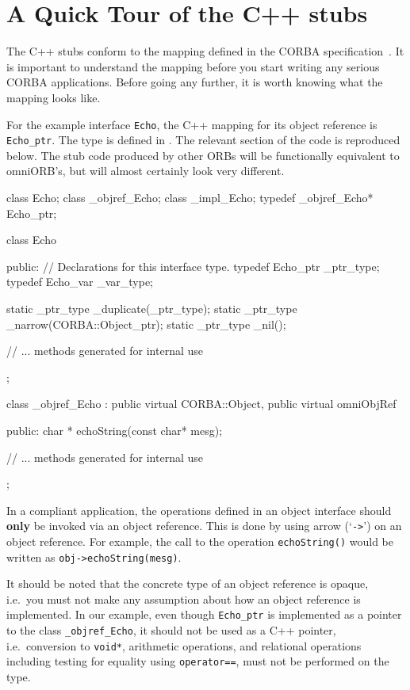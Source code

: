 \documentclass[11pt,twoside,a4paper]{book}
\newcommand{\type}[1]{\texttt{#1}}
\newcommand{\intf}[1]{\texttt{#1}}
\newcommand{\code}[1]{\texttt{#1}}
\newcommand{\op}[1]{\texttt{#1()}}
\newcommand{\file}{\begingroup \urlstyle{tt}\Url}
\begin{document}
\section{A Quick Tour of the C++ stubs}

The C++ stubs conform to the mapping defined in the CORBA
specification~\cite{cxxmapping}. It is important to understand the
mapping before you start writing any serious CORBA applications.
Before going any further, it is worth knowing what the mapping looks
like.

For the example interface \intf{Echo}, the C++ mapping for its object
reference is \type{Echo\_ptr}. The type is defined in \file{echo.hh}.
The relevant section of the code is reproduced below. The stub code
produced by other ORBs will be functionally equivalent to omniORB's,
but will almost certainly look very different.

\begin{cxxlisting}
class Echo;
class _objref_Echo;
class _impl_Echo;
typedef _objref_Echo* Echo_ptr;

class Echo {
public:
  // Declarations for this interface type.
  typedef Echo_ptr _ptr_type;
  typedef Echo_var _var_type;

  static _ptr_type _duplicate(_ptr_type);
  static _ptr_type _narrow(CORBA::Object_ptr);
  static _ptr_type _nil();

  // ... methods generated for internal use
};

class _objref_Echo :
  public virtual CORBA::Object, public virtual omniObjRef {
public:
  char * echoString(const char* mesg);

  // ... methods generated for internal use
};
\end{cxxlisting}

In a compliant application, the operations defined in an object
interface should \textbf{only} be invoked via an object reference.
This is done by using arrow (`\code{->}') on an object reference.
For example, the call to the operation \op{echoString} would be
written as \code{obj->echoString(mesg)}.

It should be noted that the concrete type of an object reference is
opaque, i.e.\ you must not make any assumption about how an object
reference is implemented. In our example, even though \type{Echo\_ptr}
is implemented as a pointer to the class \type{\_objref\_Echo}, it
should not be used as a C++ pointer, i.e.\ conversion to \type{void*},
arithmetic operations, and relational operations including testing for
equality using \code{operator==}, must not be performed on the type.
\end{document}
